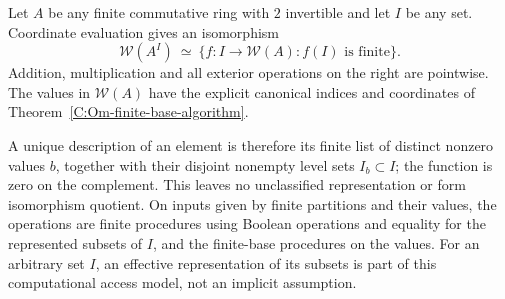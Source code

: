 \begin{theorem}
\label{C:finite-ring-powers}
Let $A$ be any finite commutative ring with $2$ invertible and let
$I$ be any set. Coordinate evaluation gives an isomorphism
\[
 \mathcal W(A^I)\ \simeq\
 \bigl\{f:I\longrightarrow\mathcal W(A):
                    f(I)\text{ is finite}\bigr\}.           \tag{C.3.L2}
\]
Addition, multiplication and all exterior operations on the right
are pointwise. The values in $\mathcal W(A)$ have the explicit
canonical indices and coordinates of
Theorem~\ref{C:Om-finite-base-algorithm}.

A unique description of an element is therefore its finite list of
distinct nonzero values $b$, together with their disjoint nonempty
level sets $I_b\subset I$; the function is zero on the complement.
This leaves no unclassified representation or form isomorphism
quotient. On inputs given by finite partitions and their values,
the operations are finite procedures using Boolean operations
and equality for the represented subsets of $I$, and the
finite-base procedures on the values. For an arbitrary set $I$,
an effective representation of its subsets is part of this
computational access model, not an implicit assumption.
\end{theorem}
